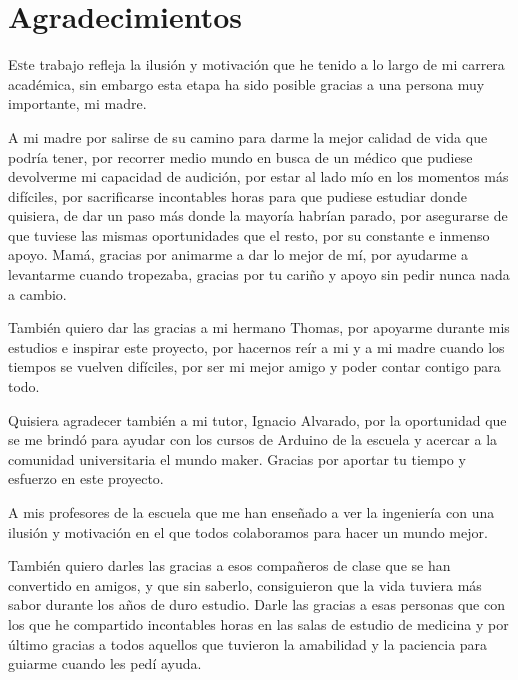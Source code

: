 \chapter*{Agradecimientos}
\pagestyle{empty}

\lettrine[lraise=-0.1, lines=2, loversize=0.25] Este trabajo refleja la ilusión y motivación que he tenido a lo largo de mi carrera
académica, sin embargo esta etapa ha sido posible gracias a una persona muy importante, mi madre.

A mi madre por salirse de su camino para darme la mejor calidad de vida que podría tener, por recorrer medio mundo en busca de un médico que pudiese devolverme
mi capacidad de audición, por estar al lado mío en los momentos más difíciles, por sacrificarse incontables horas para que pudiese estudiar donde quisiera, de
dar un paso más donde la mayoría habrían parado, por asegurarse de que tuviese las mismas oportunidades que el resto, por su constante e inmenso apoyo. Mamá, gracias
por animarme a dar lo mejor de mí, por ayudarme a levantarme cuando tropezaba, gracias por tu cariño y apoyo sin pedir nunca nada a cambio. 

También quiero dar las gracias a mi hermano Thomas, por apoyarme durante mis estudios e inspirar este proyecto, por hacernos reír a mi y a mi madre cuando
los tiempos se vuelven difíciles, por ser mi mejor amigo y poder contar contigo para todo.

Quisiera agradecer también a mi tutor, Ignacio Alvarado, por la oportunidad que se me brindó para ayudar con los cursos
de Arduino de la escuela y acercar a la comunidad universitaria el mundo maker. Gracias por aportar tu tiempo y esfuerzo en este proyecto.

A mis profesores de la escuela que me han enseñado a ver la ingeniería con una ilusión y motivación en el que todos colaboramos para hacer un mundo mejor.

También quiero darles las gracias a esos compañeros de clase que se han convertido en amigos, y que
sin saberlo, consiguieron que la vida tuviera más sabor durante los años de duro estudio. Darle las gracias a esas personas
que con los que he compartido incontables horas en las salas de estudio de medicina y por último
gracias a todos aquellos que tuvieron la amabilidad y la paciencia para guiarme cuando les pedí ayuda.

{}%
{}%